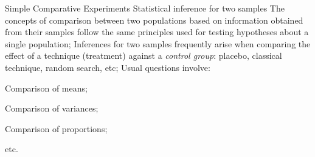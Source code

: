\documentclass[t]{beamer}
\begin{document}


\begin{ftst}
{Simple Comparative Experiments}
{Statistical inference for two samples}
The concepts of comparison between two populations based on information obtained from their samples follow the same principles used for testing hypotheses about a single population;
\vone
Inferences for two samples frequently arise when comparing the effect of a technique (treatment) against a \textit{control group}: placebo, classical technique, random search, etc;
\vone
Usual questions involve:

\bitems Comparison of means;
\item Comparison of variances;
\item Comparison of proportions;
\item etc.
\eitem
\end{ftst}

\end{document}
